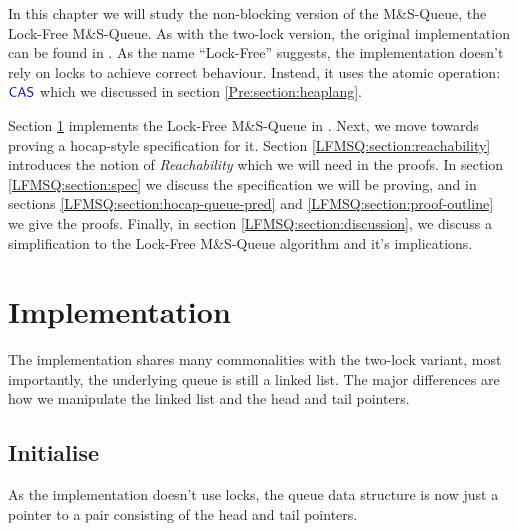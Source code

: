 \documentclass[a4paper, 10pt]{report}
\theoremstyle{definition}
\newcommand{\msq}{M\&S-Queue\xspace}
\newcommand{\lfmsq}{Lock-Free \msq}
\begin{document}
In this chapter we will study the non-blocking version of the \msq, the \lfmsq. As with the two-lock version, the original implementation can be found in \cite{DBLP:conf/podc/MichaelS96}. As the name ``Lock-Free'' suggests, the implementation doesn't rely on locks to achieve correct behaviour. Instead, it uses the atomic operation: $\textsf{\color{blue} CAS}$ which we discussed in section \ref{Pre:section:heaplang}.

Section \ref{LFMSQ:section:implementation} implements the \lfmsq in \heaplang. Next, we move towards proving a hocap-style specification for it. Section \ref{LFMSQ:section:reachability} introduces the notion of \textit{Reachability} which we will need in the proofs. In section \ref{LFMSQ:section:spec} we discuss the specification we will be proving, and in sections \ref{LFMSQ:section:hocap-queue-pred} and \ref{LFMSQ:section:proof-outline} we give the proofs. Finally, in section \ref{LFMSQ:section:discussion}, we discuss a simplification to the \lfmsq algorithm and it's implications.

\section{Implementation}
\label{LFMSQ:section:implementation}

The implementation shares many commonalities with the two-lock variant, most importantly, the underlying queue is still a linked list. The major differences are how we manipulate the linked list and the head and tail pointers.

\subsection{Initialise}
As the implementation doesn't use locks, the queue data structure is now just a pointer to a pair consisting of the head and tail pointers.
\end{document}
